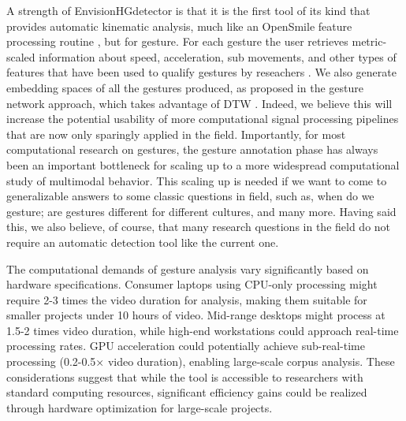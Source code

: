 \documentclass[11pt,headings=small,cleardoublepage=empty,tocflat,numbers=noenddot,twoside,captions=tableheading]{scrbook}
\begin{document}
\begin{refsection}
\begin{table}[H]
\begin{table}[H]
\begin{table}[H]
\begin{table}[H]
A strength of EnvisionHGdetector is that it is the first tool of its kind that provides automatic kinematic analysis, much like an OpenSmile feature processing routine \parencite{eybenOpensmileMunichVersatile2010}, but for gesture. For each gesture the user retrieves metric-scaled information about speed, acceleration, sub movements, and other types of features that have been used to qualify gestures by reseachers \parencite{trujilloMarkerlessAutomaticAnalysis2019, trujilloCommunicativeIntentModulates2018, pouwSystematicInvestigationGesture2021}. We also generate embedding spaces of all the gestures produced, as proposed in the gesture network approach, which takes advantage of DTW \parencite{pouwGestureNetworksIntroducing2019}. Indeed, we believe this will increase the potential usability of more computational signal processing pipelines that are now only sparingly applied in the field. Importantly, for most computational research on gestures, the gesture annotation phase has always been an important bottleneck for scaling up to a more widespread computational study of multimodal behavior. This scaling up is needed if we want to come to generalizable answers to some classic questions in field, such as, when do we gesture; are gestures different for different cultures, and many more. Having said this, we also believe, of course, that many research questions in the field do not require an automatic detection tool like the current one.

The computational demands of gesture analysis vary significantly based on hardware specifications. Consumer laptops using CPU-only processing might require 2-3 times the video duration for analysis, making them suitable for smaller projects under 10 hours of video. Mid-range desktops might process at 1.5-2 times video duration, while high-end workstations could approach real-time processing rates. GPU acceleration could potentially achieve sub-real-time processing (0.2-0.5× video duration), enabling large-scale corpus analysis. These considerations suggest that while the tool is accessible to researchers with standard computing resources, significant efficiency gains could be realized through hardware optimization for large-scale projects.


\end{table}
\end{table}
\end{table}
\end{table}
\end{refsection}
\end{document}
